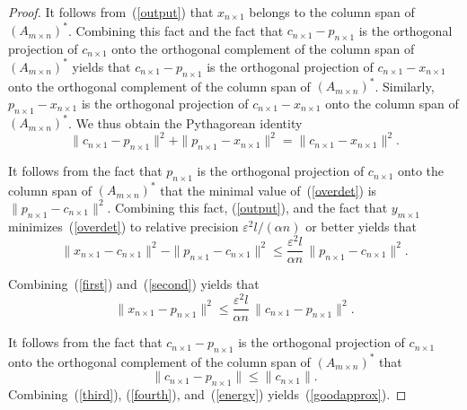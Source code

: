 \documentclass[letterpaper,12pt]{article}
\def\epsilon{\varepsilon}
\begin{document}
\begin{proof}
It follows from~(\ref{output}) that $x_{n \times 1}$
belongs to the column span of $(A_{m \times n})^*$.
Combining this fact and the fact that $c_{n \times 1} - p_{n \times 1}$
is the orthogonal projection of $c_{n \times 1}$
onto the orthogonal complement of the column span of $(A_{m \times n})^*$
yields that $c_{n \times 1} - p_{n \times 1}$ is the orthogonal projection
of $c_{n \times 1} - x_{n \times 1}$
onto the orthogonal complement of the column span of $(A_{m \times n})^*$.
Similarly, $p_{n \times 1} - x_{n \times 1}$ is the orthogonal projection
of $c_{n \times 1} - x_{n \times 1}$
onto the column span of $(A_{m \times n})^*$.
We thus obtain the Pythagorean identity
\begin{equation}
\label{first}
\| c_{n \times 1} - p_{n \times 1} \|^2
+ \| p_{n \times 1} - x_{n \times 1} \|^2
= \| c_{n \times 1} - x_{n \times 1} \|^2.
\end{equation}

It follows from the fact that $p_{n \times 1}$ is the orthogonal projection
of $c_{n \times 1}$ onto the column span of $(A_{m \times n})^*$ that
the minimal value of~(\ref{overdet})
is $\| p_{n \times 1} - c_{n \times 1} \|^2$.
Combining this fact, (\ref{output}), and the fact that $y_{m \times 1}$
minimizes~(\ref{overdet}) to relative precision $\epsilon^2 l/(\alpha n)$
or better yields that
\begin{equation}
\label{second}
\| x_{n \times 1} - c_{n \times 1} \|^2-\| p_{n \times 1} - c_{n \times 1} \|^2
\le \frac{\epsilon^2 l}{\alpha n} \, \| p_{n \times 1} - c_{n \times 1} \|^2.
\end{equation}

Combining~(\ref{first}) and~(\ref{second}) yields that
\begin{equation}
\label{third}
\| x_{n \times 1} - p_{n \times 1} \|^2
\le \frac{\epsilon^2 l}{\alpha n} \, \| c_{n \times 1} - p_{n \times 1} \|^2.
\end{equation}

It follows from the fact that $c_{n \times 1} - p_{n \times 1}$
is the orthogonal projection of $c_{n \times 1}$
onto the orthogonal complement of the column span of $(A_{m \times n})^*$ that
\begin{equation}
\label{fourth}
\| c_{n \times 1} - p_{n \times 1} \| \le \| c_{n \times 1} \|.
\end{equation}
Combining~(\ref{third}), (\ref{fourth}), and~(\ref{energy})
yields~(\ref{goodapprox}).
\end{proof}
\end{document}
